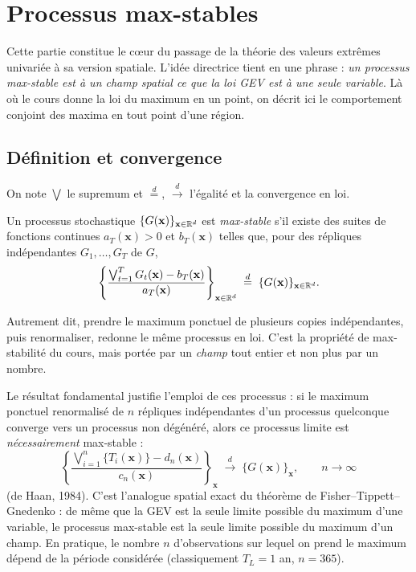 \section{Processus max-stables}

Cette partie constitue le cœur du passage de la théorie des valeurs extrêmes
univariée à sa version spatiale. L'idée directrice tient en une phrase :
\emph{un processus max-stable est à un champ spatial ce que la loi GEV est à une
seule variable}. Là où le cours donne la loi du maximum en un point, on décrit
ici le comportement conjoint des maxima en tout point d'une région.

\subsection{Définition et convergence}

On note $\bigvee$ le supremum et $\overset{d}{=}$, $\overset{d}{\to}$ l'égalité
et la convergence en loi.

\begin{definition}
Un processus stochastique $\{G(\mathbf x)\}_{\mathbf x\in\mathbb{R}^d}$ est
\emph{max-stable} s'il existe des suites de fonctions continues
$a_T(\mathbf x)>0$ et $b_T(\mathbf x)$ telles que, pour des répliques
indépendantes $G_1,\dots,G_T$ de $G$,
\[
\left\{\frac{\bigvee_{t=1}^T G_t(\mathbf x)-b_T(\mathbf x)}{a_T(\mathbf x)}\right\}_{\mathbf x\in\mathbb{R}^d}
\;\overset{d}{=}\; \{G(\mathbf x)\}_{\mathbf x\in\mathbb{R}^d}.
\]
\end{definition}

Autrement dit, prendre le maximum ponctuel de plusieurs copies indépendantes,
puis renormaliser, redonne le même processus en loi. C'est la propriété de
max-stabilité du cours, mais portée par un \emph{champ} tout entier et non plus
par un nombre.

Le résultat fondamental justifie l'emploi de ces processus : si le maximum
ponctuel renormalisé de $n$ répliques indépendantes d'un processus quelconque
converge vers un processus non dégénéré, alors ce processus limite est
\emph{nécessairement} max-stable :
\begin{equation}\label{eq:conv-ms}
\left\{\frac{\bigvee_{i=1}^n \{T_i(\mathbf x)\}-d_n(\mathbf x)}{c_n(\mathbf x)}\right\}_{\mathbf x}
\;\overset{d}{\to}\; \{G(\mathbf x)\}_{\mathbf x},\qquad n\to\infty
\end{equation}
(de Haan, 1984). C'est l'analogue spatial exact du théorème de
Fisher--Tippett--Gnedenko : de même que la GEV est la seule limite possible du
maximum d'une variable, le processus max-stable est la seule limite possible du
maximum d'un champ. En pratique, le nombre $n$ d'observations sur lequel on
prend le maximum dépend de la période considérée (classiquement $T_L=1$ an,
$n=365$).

